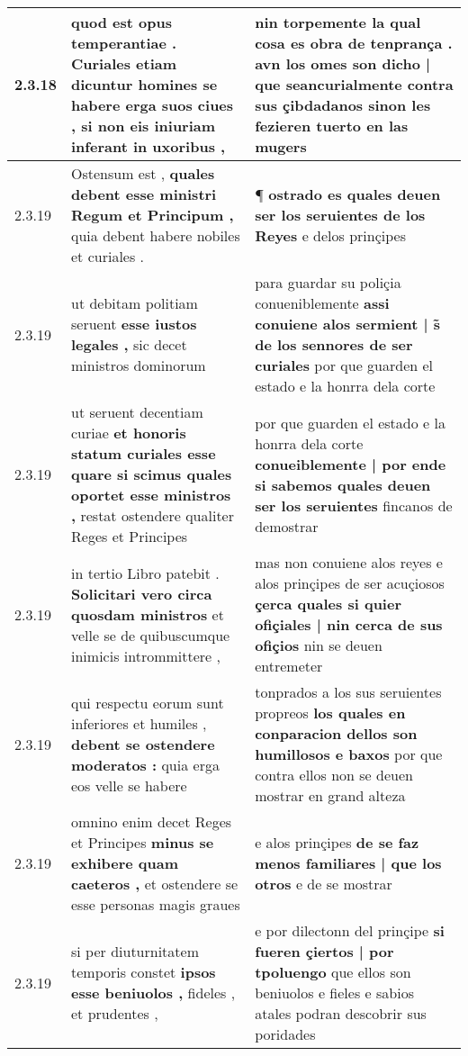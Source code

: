 \begin{tabular}{|p{1cm}|p{6.5cm}|p{6.5cm}|}
2.3.18 & quod est opus temperantiae . \textbf{ Curiales etiam dicuntur homines se habere erga suos ciues , } si non eis iniuriam inferant in uxoribus , & nin torpemente la qual cosa es obra de tenprança . \textbf{ avn los omes son dicho | que } seancurialmente contra sus çibdadanos sinon les fezieren tuerto en las mugers \\\hline
2.3.19 & Ostensum est , \textbf{ quales debent esse ministri Regum et Principum , } quia debent habere nobiles et curiales . & ¶ \textbf{ ostrado es quales deuen ser los seruientes de los Reyes } e delos prinçipes \\\hline
2.3.19 & ut debitam politiam seruent \textbf{ esse iustos legales , } sic decet ministros dominorum & para guardar su poliçia conueniblemente \textbf{ assi conuiene alos sermient | s̃ de los sennores de ser curiales } por que guarden el estado e la honrra dela corte \\\hline
2.3.19 & ut seruent decentiam curiae \textbf{ et honoris statum curiales esse quare si scimus quales oportet esse ministros , } restat ostendere qualiter Reges et Principes & por que guarden el estado e la honrra dela corte \textbf{ conueiblemente | por ende si sabemos quales deuen ser los seruientes } fincanos de demostrar \\\hline
2.3.19 & in tertio Libro patebit . \textbf{ Solicitari vero circa quosdam ministros } et velle se de quibuscumque inimicis intrommittere , & mas non conuiene alos reyes e alos prinçipes de ser acuçiosos \textbf{ çerca quales si quier ofiçiales | nin cerca de sus ofiçios } nin se deuen entremeter \\\hline
2.3.19 & qui respectu eorum sunt inferiores et humiles , \textbf{ debent se ostendere moderatos : } quia erga eos velle se habere & tonprados a los sus seruientes propreos \textbf{ los quales en conparacion dellos son humillosos e baxos } por que contra ellos non se deuen mostrar en grand alteza \\\hline
2.3.19 & omnino enim decet Reges et Principes \textbf{ minus se exhibere quam caeteros , } et ostendere se esse personas magis graues & e alos prinçipes \textbf{ de se faz menos familiares | que los otros } e de se mostrar \\\hline
2.3.19 & si per diuturnitatem temporis constet \textbf{ ipsos esse beniuolos , } fideles , et prudentes , & e por dilectonn del prinçipe \textbf{ si fueren çiertos | por tpoluengo } que ellos son beniuolos e fieles e sabios atales podran descobrir sus poridades \\\hline

\end{tabular}
